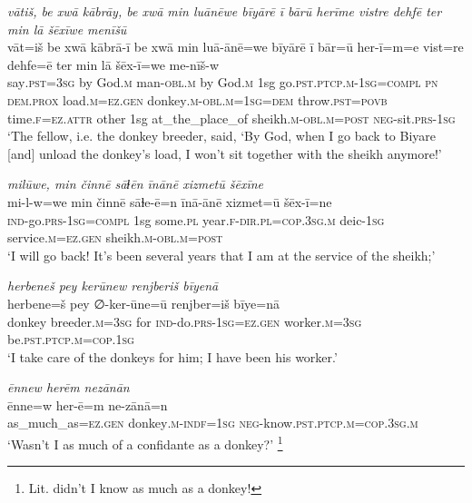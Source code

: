 \ea \label{HB.67}
\textit{vātiš, be xwā kābrāy, be xwā min luānēwe bīyārē ī bārū herīme vistre dehfē ter min lā šēxīwe menīšū} \\ 
\gll vāt=iš be xwā kābrā-ī be xwā min luā-ānē=we bīyārē ī bār=ū her-ī=m=e vist=re dehfe=ē ter min lā šēx-ī=we me-nīš-w \\ 
 say\textsc{.pst}\textsc{=3sg} by God\textsc{.m} man\textsc{-obl}\textsc{.m} by God\textsc{.m} 1sg go\textsc{.pst}\textsc{.ptcp}\textsc{.m}\textsc{-1sg}\textsc{=\textsc{compl}} \textsc{pn} \textsc{dem.prox} load\textsc{.m}\textsc{=ez}\textsc{.gen} donkey\textsc{.m}\textsc{-obl}\textsc{.m}\textsc{=1sg}\textsc{=dem} throw\textsc{.pst}\textsc{=\textsc{povb}} time\textsc{\textsc{.f}}\textsc{=ez}.\textsc{attr} other 1sg at\_the\_place\_of sheikh\textsc{.m}\textsc{-obl}\textsc{.m}\textsc{=\textsc{post}} \textsc{neg-}sit\textsc{.prs}\textsc{-1sg} \\ 
\glt `The fellow, i.e. the donkey breeder, said, ‘By God, when I go back to Biyare [and] unload the donkey’s load, I won’t sit together with the sheikh anymore!'
\z 
 
\ea \label{HB.68}
\textit{milūwe, min činnē sāɫēn īnānē xizmetū šēxīne} \\ 
\gll mi-l-w=we min činnē sāɫe-ē=n īnā-ānē xizmet=ū šēx-ī=ne \\ 
 \textsc{ind-}go\textsc{.prs}\textsc{-1sg}\textsc{=\textsc{compl}} 1sg some\textsc{.pl} year\textsc{\textsc{.f}}\textsc{-dir}\textsc{.pl}\textsc{=cop}\textsc{.3sg}\textsc{.m} deic\textsc{-1sg} service\textsc{.m}\textsc{=ez}\textsc{.gen} sheikh\textsc{.m}\textsc{-obl}\textsc{.m}\textsc{=\textsc{post}} \\ 
\glt `I will go back! It’s been several years that I am at the service of the sheikh;'
\z 
 
\ea \label{HB.69}
\textit{herbeneš pey kerūnew renjberiš bīyenā} \\ 
\gll herbene=š pey ∅-ker-ūne=ū renjber=iš bīye=nā \\ 
 donkey breeder\textsc{.m}\textsc{=3sg} for \textsc{ind-}do\textsc{.prs}\textsc{-1sg}\textsc{=ez}\textsc{.gen} worker\textsc{.m}\textsc{=3sg} be\textsc{.pst}\textsc{.ptcp}\textsc{.m}\textsc{=cop}\textsc{.1sg} \\ 
\glt `I take care of the donkeys for him; I have been his worker.'
\z 
 
\ea \label{HB.70}
\textit{ēnnew herēm nezānān} \\ 
\gll ēnne=w her-ē=m ne-zānā=n \\ 
 as\_much\_as\textsc{=ez}\textsc{.gen} donkey\textsc{.m}\textsc{-indf}\textsc{=1sg} \textsc{neg-}know\textsc{.pst}\textsc{.ptcp}\textsc{.m}\textsc{=cop}\textsc{.3sg}\textsc{.m} \\ 
\glt `Wasn’t I as much of a confidante as a donkey?' \footnote{Lit. didn’t I know as much as a donkey!}
\z 
 
